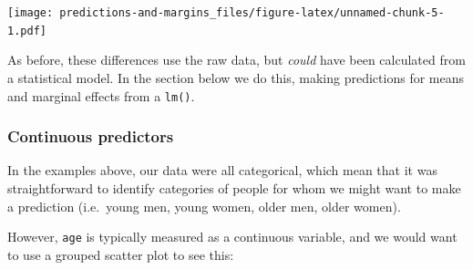 \documentclass[]{article}
\newenvironment{Shaded}{\begin{snugshade}}{\end{snugshade}}
\newcommand{\CommentTok}[1]{\textcolor[rgb]{0.56,0.35,0.01}{\textit{#1}}}
\newcommand{\DataTypeTok}[1]{\textcolor[rgb]{0.13,0.29,0.53}{#1}}
\newcommand{\DecValTok}[1]{\textcolor[rgb]{0.00,0.00,0.81}{#1}}
\newcommand{\KeywordTok}[1]{\textcolor[rgb]{0.13,0.29,0.53}{\textbf{#1}}}
\newcommand{\NormalTok}[1]{#1}
\newcommand{\OperatorTok}[1]{\textcolor[rgb]{0.81,0.36,0.00}{\textbf{#1}}}
\newcommand{\StringTok}[1]{\textcolor[rgb]{0.31,0.60,0.02}{#1}}
\begin{document}
\begin{Shaded}
\end{Shaded}

\texttt{[image: predictions-and-margins\_files/figure-latex/unnamed-chunk-5-1.pdf]}

As before, these differences use the raw data, but \emph{could} have been calculated
from a statistical model. In the section below we do this, making predictions
for means and marginal effects from a \texttt{lm()}.

\hypertarget{continuous-predictors-1}{%
\subsubsection*{Continuous predictors}\label{continuous-predictors-1}}

In the examples above, our data were all categorical, which mean that it was
straightforward to identify categories of people for whom we might want to make
a prediction (i.e.~young men, young women, older men, older women).

However, \texttt{age} is typically measured as a continuous variable, and we would want
to use a grouped scatter plot to see this:
\end{document}
